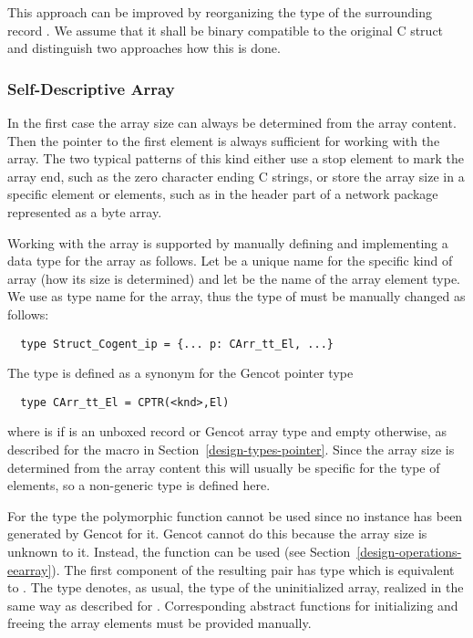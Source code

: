 This approach can be improved by reorganizing the type of the surrounding record . We
assume that it shall be binary compatible to the original C struct  and distinguish two approaches how 
this is done.

\subsubsection{Self-Descriptive Array}

In the first case the array size can always be determined from the array content. Then the pointer to the first 
element is always sufficient for working with the array. The two typical patterns of this kind either use a 
stop element to mark the array end, such as the zero character ending C strings, or store the array size in a
specific element or elements, such as in the header part of a network package represented as a byte array.

Working with the array is supported by manually defining and implementing a data type for the array as follows.
Let  be a unique name for the specific kind of array (how its size is determined) and let  be the
name of the array element type. We use  as type name for the array, thus the 
type of  must be manually changed as follows:
\begin{verbatim}
  type Struct_Cogent_ip = {... p: CArr_tt_El, ...}
\end{verbatim}

The type  is defined as a synonym for the Gencot pointer type
\begin{verbatim}
  type CArr_tt_El = CPTR(<knd>,El)
\end{verbatim}
where  is  if  is an unboxed record or Gencot array type and empty otherwise, as described
for the macro  in Section~\ref{design-types-pointer}.
Since the array size is determined from the array content this will usually be specific for the type of elements,
so a non-generic type is defined here.

For the type  the polymorphic function  cannot be used since no instance has been
generated by Gencot for it. Gencot cannot do this because the array size is unknown to it. Instead, the function
 can be used (see Section~\ref{design-operations-eearray}). The first component of the resulting
pair has type  which is equivalent to . The type  
denotes, as usual, the type of the uninitialized array, realized in the same way as described for . 
Corresponding abstract functions for initializing and freeing the array elements must be provided manually.

